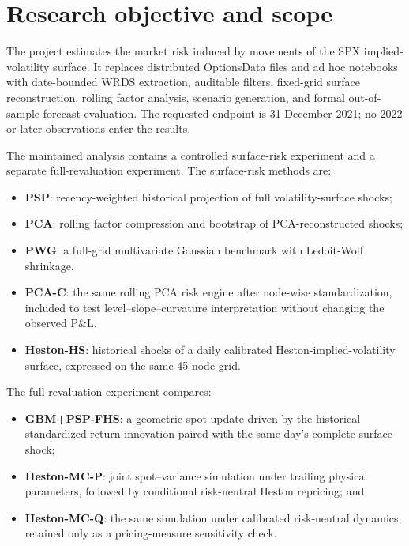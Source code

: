 \documentclass[11pt,a4paper]{article}
\begin{document}
\clearpage
\tableofcontents
\clearpage
\listoffigures
\clearpage
\listoftables
\clearpage
{}

\section{Research objective and scope}

The project estimates the market risk induced by movements of the SPX implied-volatility surface.
It replaces distributed OptionsData files and ad hoc notebooks with date-bounded WRDS extraction,
auditable filters, fixed-grid surface reconstruction, rolling factor analysis, scenario generation,
and formal out-of-sample forecast evaluation. The requested endpoint is 31 December 2021; no 2022
or later observations enter the results.

The maintained analysis contains a controlled surface-risk experiment and a separate full-revaluation
experiment. The surface-risk methods are:

\begin{itemize}
  \item \textbf{PSP}: recency-weighted historical projection of full volatility-surface shocks;
  \item \textbf{PCA}: rolling factor compression and bootstrap of PCA-reconstructed shocks;
  \item \textbf{PWG}: a full-grid multivariate Gaussian benchmark with Ledoit-Wolf shrinkage.
  \item \textbf{PCA-C}: the same rolling PCA risk engine after node-wise standardization, included
  to test level--slope--curvature interpretation without changing the observed P\&L.
  \item \textbf{Heston-HS}: historical shocks of a daily calibrated Heston-implied-volatility
  surface, expressed on the same 45-node grid.
\end{itemize}

The full-revaluation experiment compares:
\begin{itemize}
  \item \textbf{GBM+PSP-FHS}: a geometric spot update driven by the historical standardized return
  innovation paired with the same day's complete surface shock;
  \item \textbf{Heston-MC-P}: joint spot--variance simulation under trailing physical parameters,
  followed by conditional risk-neutral Heston repricing; and
  \item \textbf{Heston-MC-Q}: the same simulation under calibrated risk-neutral dynamics, retained
  only as a pricing-measure sensitivity check.
\end{itemize}
\end{document}
